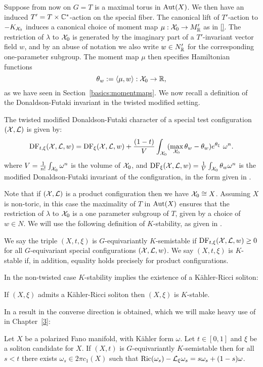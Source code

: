 Suppose from now on \(G = T\) is a maximal torus in \(\mathop{\rm Aut}\nolimits(X)\). We then have an induced \(T' = T \times \mathbb{C}^*\)-action on the special fiber. The canonical lift of \(T'\)-action to \(-K_{{\mathcal{X}}_0}\) induces a canonical choice of moment map \(\mu: {\mathcal{X}}_0 \to M_{\mathbb{R}}'\) as in \ref{}. The restriction of \(\lambda\) to \({\mathcal{X}}_0\) is generated by the imaginary part of a \(T'\)-invariant vector field \(w\), and by an abuse of notation we also write \(w \in N'_{\mathbb{R}}\) for the corresponding  one-parameter subgroup. The moment map \(\mu\) then specifies Hamiltonian functions
\[
\theta_w := \langle \mu, w \rangle: {\mathcal{X}}_0 \to \mathbb{R},
\]
as we have seen in Section~\ref{basics:momentmaps}. We now recall a definition of the Donaldson-Futaki invariant in the twisted modified setting.
\begin{definition}
The twisted modified Donaldson-Futaki character of a special test configuration \(({\mathcal{X}}, \mathcal{L}) \) is given by:
\[
\mathop{\rm DF}\nolimits_{t,\xi}({\mathcal{X}},\mathcal{L},w) = \mathop{\rm DF}\nolimits_{\xi}({\mathcal{X}},\mathcal{L},w) + \frac{(1-t)}{V} \int_{{\mathcal{X}}_0} ( \max_{{\mathcal{X}}_0} \theta_w - \theta_w)e^{\theta_\xi} \ \omega^n . 
\]
where \(V = \frac{1}{n!} \int_{{\mathcal{X}}_0} \omega^n\) is the volume of \({\mathcal{X}}_0\), and \(\mathop{\rm DF}\nolimits_\xi({\mathcal{X}},\mathcal{L},w) = \frac{1}{V} \int_{{\mathcal{X}}_0} \theta_w \omega^n\) is the modified Donaldson-Futaki invariant of the configuration, in the form given in \cite[Lemma 3.4]{berman2014complex}.
\end{definition}
Note that if \(({\mathcal{X}},\mathcal{L})\) is a product configuration then we have \({\mathcal{X}}_0 \cong X\). Assuming \(X\) is non-toric, in this case the maximality of \(T\) in \(\mathop{\rm Aut}\nolimits(X)\) ensures that the restriction of \(\lambda\) to \({\mathcal{X}}_0\) is a one parameter subgroup of \(T\), given by a choice of \(w \in N\). We will use the following definition of \(K\)-stability, as given in \cite{datar2016kahler}.
\begin{definition}
We say the triple  \((X,t,\xi)\) is \(G\)-equivariantly \(K\)-semistable if \( \mathop{\rm DF}\nolimits_{t,\xi}({\mathcal{X}},\mathcal{L},w) \ge 0\) for all \(G\)-equivariant special configurations \(({\mathcal{X}},\mathcal{L},w)\). We say \((X,t,\xi)\) is \(K\)-stable if, in addition, equality holds precisely for product configurations. 
\end{definition}
In the non-twisted case \(K\)-stability implies the existence of a K\"ahler-Ricci soliton:
\begin{theorem} \label{thm:BWN}
If \((X,\xi)\) admits a K\"ahler-Ricci soliton then \((X,\xi)\) is \(K\)-stable.
\end{theorem}
In \cite{datar2016kahler} a result in the converse direction is obtained, which we will make heavy use of in Chapter~\ref{3}:
\begin{theorem} \label{thm:DS}
Let \(X\) be a polarized Fano manifold, with K\"ahler form \(\omega\). Let \(t \in [0,1]\) and \(\xi\) be a soliton candidate for \(X\). If \((X,t)\) is \(G\)-equivariantly \(K\)-semistable then for all \(s <t\)  there exists \(\omega_s \in 2 \pi c_1(X)\) such that \(\mathop{\rm Ric}\nolimits(\omega_s) - \mathcal{L}_\xi \omega_s = s \omega_s + (1-s) \omega\).
\end{theorem}
